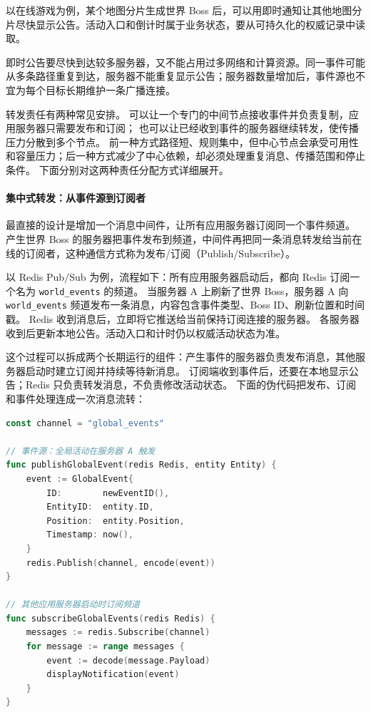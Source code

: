 以在线游戏为例，某个地图分片生成世界 Boss 后，可以用即时通知让其他地图分片尽快显示公告。活动入口和倒计时属于业务状态，要从可持久化的权威记录中读取。

即时公告要尽快到达较多服务器，又不能占用过多网络和计算资源。同一事件可能从多条路径重复到达，服务器不能重复显示公告；服务器数量增加后，事件源也不宜为每个目标长期维护一条广播连接。

转发责任有两种常见安排。
可以让一个专门的中间节点接收事件并负责复制，应用服务器只需要发布和订阅；
也可以让已经收到事件的服务器继续转发，使传播压力分散到多个节点。
前一种方式路径短、规则集中，但中心节点会承受可用性和容量压力；后一种方式减少了中心依赖，却必须处理重复消息、传播范围和停止条件。
下面分别对这两种责任分配方式详细展开。

\paragraph{集中式转发：从事件源到订阅者}

最直接的设计是增加一个消息中间件，让所有应用服务器订阅同一个事件频道。
产生世界 Boss 的服务器把事件发布到频道，中间件再把同一条消息转发给当前在线的订阅者，这种通信方式称为发布/订阅（Publish/Subscribe）。

以 Redis Pub/Sub 为例，流程如下：所有应用服务器启动后，都向 Redis 订阅一个名为 \texttt{world\_events} 的频道。
当服务器 A 上刷新了世界 Boss，服务器 A 向 \texttt{world\_events} 频道发布一条消息，内容包含事件类型、Boss ID、刷新位置和时间戳。
Redis 收到消息后，立即将它推送给当前保持订阅连接的服务器。
各服务器收到后更新本地公告。活动入口和计时仍以权威活动状态为准。

这个过程可以拆成两个长期运行的组件：产生事件的服务器负责发布消息，其他服务器启动时建立订阅并持续等待新消息。
订阅端收到事件后，还要在本地显示公告；Redis 只负责转发消息，不负责修改活动状态。
下面的伪代码把发布、订阅和事件处理连成一次消息流转：

\begin{tcolorbox}[title=Redis Pub/Sub 的发布与订阅流程]
\begin{lstlisting}[style=codeblock, language=go]
const channel = "global_events"

// 事件源：全局活动在服务器 A 触发
func publishGlobalEvent(redis Redis, entity Entity) {
    event := GlobalEvent{
        ID:        newEventID(),
        EntityID:  entity.ID,
        Position:  entity.Position,
        Timestamp: now(),
    }
    redis.Publish(channel, encode(event))
}

// 其他应用服务器启动时订阅频道
func subscribeGlobalEvents(redis Redis) {
    messages := redis.Subscribe(channel)
    for message := range messages {
        event := decode(message.Payload)
        displayNotification(event)
    }
}
\end{lstlisting}
\end{tcolorbox}

